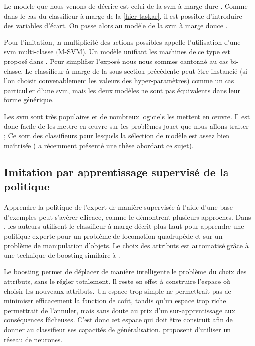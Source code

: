 \documentclass[frenchb,a4paper,justified,notoc]{tufte-book}
\begin{document}
Le modèle que nous venons de décrire est celui de la \gls{svm} à marge dure \citep{boser1992training}. Comme dans le cas du classifieur à marge de la \autoref{hier-taskar}, il est possible d'introduire des variables d'écart. On passe alors au modèle de la \gls{svm} à marge douce \citep{cortes1995support}.

Pour l'imitation, la multiplicité des actions possibles appelle l'utilisation d'une \gls{svm} multi-classe (M-SVM). Un modèle unifiant les machines de ce type est proposé dans \citep{guermeur2012generic}. Pour simplifier l'exposé nous nous sommes cantonné au cas bi-classe. Le classifieur à marge de la sous-section précédente peut être instancié (si l'on choisit convenablement les valeurs des hyper-paramètres) comme un cas particulier d'une \gls{svm}, mais les deux modèles ne sont pas équivalents dans leur forme générique.


Les \gls{svm} sont très populaires et de nombreux logiciels les mettent en œuvre. Il est donc facile de les mettre en œuvre sur les problèmes jouet que nous allons traiter ; Ce sont des classifieurs pour lesquels la sélection de modèle est assez bien maîtrisée (\citet{bonidal2013analyse} a récemment présenté une thèse abordant ce sujet).
\subsection{Imitation par apprentissage supervisé de la politique}
\label{sec-2-1-6}
\label{hier-myopie}

Apprendre la politique de l'expert de manière supervisée à l'aide d'une base d'exemples peut s'avérer efficace, comme le démontrent plusieurs approches. Dans \citep{ratliff2007imitation}, les auteurs utilisent le classifieur à marge décrit plus haut
pour apprendre une politique experte pour un problème de locomotion quadrupède et sur un problème de manipulation d'objets. Le choix des attributs est automatisé grâce à une technique de \gls{boosting} similaire à \citep{friedman2001greedy,mason1999functional}.

Le boosting permet de déplacer de manière intelligente le problème du choix des attributs, sans le régler totalement. Il reste en effet à construire l'espace où choisir les nouveaux attributs. Un espace trop simple ne permettrait pas de minimiser efficacement la fonction de coût, tandis qu'un espace trop riche permettrait de l'annuler, mais sans doute au prix d'un sur-apprentissage aux conséquences fâcheuses. C'est donc cet espace qui doit être construit afin de donner au classifieur ses capacités de généralisation. \citet{ratliff2007imitation} proposent d'utiliser un réseau de neurones.
\end{document}
